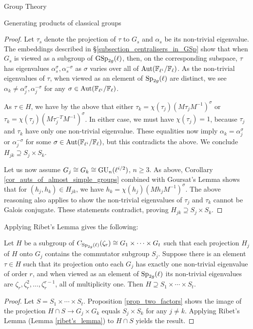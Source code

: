 \documentclass[11pt,a4paper]{article}
\newcommand{\Fl}{\mathbb{F}_\ell}
\newcommand{\Fli}{\mathbb{F}_{\ell^i}}
\newcommand{\zr}{\zeta_r}
\begin{document}
\begin{section}{Group Theory}
\begin{subsection}{Generating products of classical groups}
\begin{proof}
Let $\tau_s$ denote the projection of $\tau$ to $G_s$ and $\alpha_s$ be its non-trivial eigenvalue. The embeddings described in \S \ref{subsection_centralisers_in_GSp} show that when $G_s$ is viewed as a subgroup of $\GSp_{2g}(\ell)$, then, on the corresponding subspace, $\tau$ has eigenvalues $\alpha_s^\sigma, \alpha_s^{-\sigma}$ as $\sigma$ varies over all of $ \Aut(\Fli/\Fl)$.
As the non-trivial eigenvalues of $\tau$, when viewed as an element of $\Sp_{2g}(\ell)$ are distinct, we see $\alpha_k \neq \alpha_j^\sigma, \alpha_j^{-\sigma}$ for any $\sigma \in  \Aut(\Fli/\Fl)$.

As $\tau \in H$, we have by the above that either $\tau_k = \chi(\tau_j)(M\tau_jM^{-1})^{\sigma}$ or $\tau_k = \chi(\tau_j)(M\tau_j^{-T}M^{-1})^{\sigma}$. In either case, we must have $\chi(\tau_j)=1$, because $\tau_j$ and $\tau_k$ have only one non-trivial eigenvalue. These equalities now imply $\alpha_k = \alpha_j^\sigma$ or $ \alpha_j^{-\sigma}$ for some $\sigma \in  \Aut(\Fli/\Fl)$, but this contradicts the above. We conclude $H_{jk} \supseteq S_j \times S_k$.

Let us now assume $G_j \cong G_k \cong  \GU_n(\ell^{i/2})$, $n \geq 3$.
As above, Corollary \ref{cor_auts_of_almost_simple_groups} combined with Goursat's Lemma shows that for $(h_j,h_k) \in H_{jk}$, we have $h_k = \chi(h_j)(Mh_jM^{-1})^{\sigma}$. The above reasoning also applies to show the non-trivial eigenvalues of $\tau_j$ and $\tau_k$ cannot be Galois conjugate. These statements contradict, proving  $H_{jk} \supseteq S_j \times S_k$.
\end{proof}

Applying Ribet's Lemma gives the following:

\begin{theorem}
\label{thm_socle}
Let $H$ be a subgroup of $C_{\Sp_{2g}(\ell)}(\zr) \cong G_1 \times \cdots \times G_t$ such that each projection $H_j$ of $H$ onto $G_j$ contains the commutator subgroup $S_j$.
Suppose there is an element $\tau \in H$ such that its projection onto each $G_j$ has exactly one non-trivial eigenvalue of order $r$, and when viewed as an element of $\Sp_{2g}(\ell)$  its non-trivial eigenvalues are $\zr, \zr^2, \ldots, \zr^{r-1}$, all of multiplicity one.
Then $H \supseteq S_1 \times \cdots \times S_t$.
\end{theorem}

\begin{proof}
Let $S= S_1 \times \cdots \times S_t$. Proposition \ref{prop_two_factors} shows the image of the projection $H \cap S \rightarrow G_j \times G_k$ equals $S_j \times S_k$ for any $j \neq k$. 
Applying Ribet's Lemma (Lemma \ref{ribet's_lemma}) to $H \cap S$ yields the result.
\end{proof}
\end{subsection}
\end{section}
\end{document}
